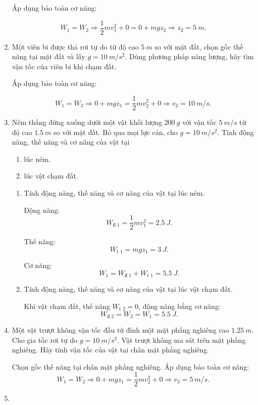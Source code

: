 \begin{enumerate}[label=\bfseries Câu \arabic*:]
	\hideall
	{	
		Áp dụng bảo toàn cơ năng:
		
		$$W_1 = W_2 \Rightarrow \dfrac{1}{2}mv_1^2 + 0 = 0 + mgz_2 \Rightarrow z_2 = \SI{5}{m}.$$
	}
	\item {}
	
	
	{
		Một viên bi được thả rơi tự do từ độ cao $\SI{5}{m}$ so với mặt đất, chọn gốc thế năng tại mặt đất và lấy $g=\SI{10}{m/s^2}$. Dùng phương pháp năng lượng, hãy tìm vận tốc của viên bi khi chạm đất.
	}
	
	\hideall
	{	
		Áp dụng bảo toàn cơ năng:
		
		$$W_1 = W_2 \Rightarrow 0 + mgz_1 = \dfrac{1}{2}mv_2^2 + 0 \Rightarrow v_2 = \SI{10}{m/s}.$$
	}
	\item {}
	
	
	{
		Ném thẳng đứng xuống dưới một vật khối lượng $\SI{200}{g}$ với vận tốc $\SI{5}{m/s}$ từ độ cao $\SI{1.5}{m}$ so với mặt đất. Bỏ qua mọi lực cản, cho $g=\SI{10}{m/s^2}$. Tính động năng, thế năng và cơ năng của vật tại
		\begin{enumerate}[label=\alph*)]
			\item lúc ném.
			\item lúc vật chạm đất.
		\end{enumerate}
	}
	
	\hideall
	{	
			\begin{enumerate}[label=\alph*)]
			\item Tính động năng, thế năng và cơ năng của vật tại lúc ném.
			
			Động năng:
			$$W_\text{đ 1} = \dfrac{1}{2}mv_1^2 = \SI{2.5}{J}.$$
			
			Thế năng:
			$$W_\text{t 1} = mgz_1 = \SI{3}{J}.$$
			
			Cơ năng:
			$$W_1 = W_\text{đ 1} + W_\text{t 1} = \SI{5.5}{J}.$$
			\item Tính động năng, thế năng và cơ năng của vật tại lúc vật chạm đất.
			
			Khi vật chạm đất, thế năng $W_\text{t 2} = 0$, động năng bằng cơ năng:
			$$W_\text{đ 2}  =W_2 = W_1 = \SI{5.5}{J}.$$
		\end{enumerate}
	}
	\item {}
	
	
	{
		Một vật trượt không vận tốc đầu từ đỉnh một mặt phẳng nghiêng cao $\SI{1.25}{m}$. Cho gia tốc rơi tự do $g=\SI{10}{m/s^2}$. Vật trượt không ma sát trên mặt phẳng nghiêng. Hãy tính vận tốc của vật tại chân mặt phẳng nghiêng.
	}
	
	\hideall
	{	
		Chọn gốc thế năng tại chân mặt phẳng nghiêng. Áp dụng bảo toàn cơ năng:
		$$W_1 = W_2 \Rightarrow 0 + mgz_1 = \dfrac{1}{2}mv_2^2 + 0 \Rightarrow v_2 = \SI{5}{m/s}.$$
	}
	\item {}
	

\end{enumerate}

